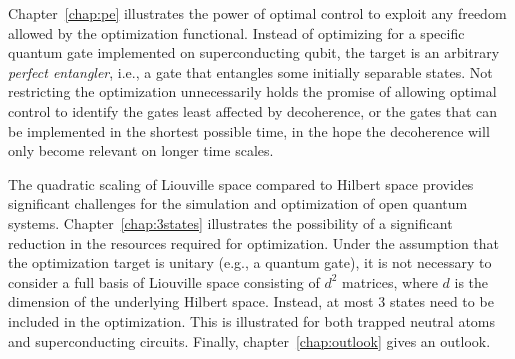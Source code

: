 Chapter~\ref{chap:pe} illustrates the power of optimal control to exploit
any freedom allowed by the optimization functional. Instead of optimizing for
a specific quantum gate implemented on superconducting qubit, the target is an
arbitrary \emph{perfect entangler}, i.e., a gate that entangles some initially
separable states. Not restricting the optimization unnecessarily holds the
promise of allowing optimal control to identify the gates least affected by
decoherence, or the gates that can be implemented in the shortest possible time,
in the hope the decoherence will only become relevant on longer time scales.

The quadratic scaling of Liouville space compared to Hilbert space provides
significant challenges for the simulation and optimization of open quantum
systems. Chapter~\ref{chap:3states} illustrates the possibility of a significant
reduction in the resources required for optimization. Under the assumption that
the optimization target is unitary (e.g., a quantum gate), it is not necessary
to consider a full basis of Liouville space consisting of $d^2$ matrices, where
$d$ is the dimension of the underlying Hilbert space. Instead, at most 3 states
need to be included in the optimization. This is illustrated for both trapped
neutral atoms and superconducting circuits.
Finally, chapter~\ref{chap:outlook} gives an outlook.

